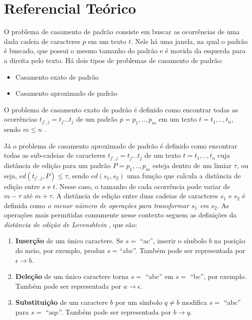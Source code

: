 \chapter{Referencial Teórico}\label{sec:ref_teorico}

O problema de casamento de padrão consiste em buscar as ocorrências de uma dada cadeia de caracteres $p$ em um texto $t$. Nele há uma janela, na qual o padrão é buscado, que possui o mesmo tamanho do padrão e é movida da esquerda para a direita pelo texto. Há dois tipos de problemas de casamento de padrão:
\begin{itemize}
    \item Casamento exato de padrão
    \item Casamento aproximado de padrão
\end{itemize}

O problema de casamento exato de padrão é definido como encontrar todas as ocorrências $t_{j',j} = t_{j'}..t_{j}$ de um padrão $p = p_{1},..,p_{m}$ em um texto $t = t_{1},..,t_{n}$, sendo $m \leq n$ \citep{farostringmatching2013}.

Já o problema de casamento aproximado de padrão é definido como encontrar todas as sub-cadeias de caracteres $t_{j',j} = t_{j'}..t_{j}$ de um texto $t = t_{1},..,t_{n}$ cuja distância de edição para um padrão $P = p_{1},..,p_{m}$ esteja dentro de um limiar $\tau$, ou seja, $ed(t_{j',j}, P) \leq \tau$, sendo $ed(s_{1}, s_{2})$ uma função que calcula a distância de edição entre $s$ e $t$. Nesse caso, o tamanho de cada ocorrência pode variar de $m - \tau$ até $m + \tau$. A distância de edição entre duas cadeias de caracteres $s_{1}$ e $s_{2}$ é definida como \textit{o menor número de operações para transformar $s_{1}$ em $s_{2}$}. As operações mais permitidas comumente nesse contexto seguem as definições da \textit{distância de edição de Levenshtein} \citep{levenshtein1966binary}, que são:

\begin{enumerate}
    \item \textbf{Inserção} de um único caractere. Se $s = $ ``ac'', inserir o símbolo $b$ na posição do meio, por exemplo, produz $s = $``abc''. Também pode ser representada por $\epsilon \to b$.
    \item \textbf{Deleção} de um único caractere torna $s = $ ``abc'' em $s = $ ``bc'', por exemplo. Também pode ser representada por $a \to \epsilon$.
    \item \textbf{Substituição} de um caractere $b$ por um símbolo $q \neq b$ modifica  $s = $ ``abc'' para $s = $ ``aqc''. Também pode ser representada por $b \to q$.
\end{enumerate}

